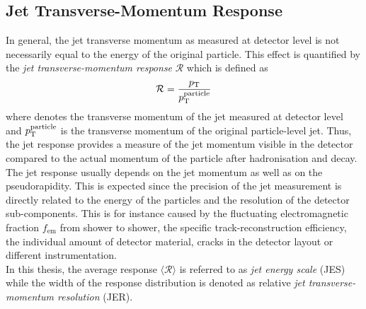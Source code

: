 \subsection{Jet Transverse-Momentum Response}
\label{subsec:jets_response}
In general, the jet transverse momentum as measured at detector level is not necessarily equal to the energy of the original particle. This effect is quantified by the \textit{jet transverse-momentum response} $\mathcal{R}$ which is defined as 
\begin{equation}
  \mathcal{R} = \frac{p_{\text{T}}}{p_{\text{T}}^{\mathrm{particle}}} 
  \label{eq:response}
 \end{equation}
where \pt denotes the transverse momentum of the jet measured at detector level and $p_{\text{T}}^{\rm{particle}}$ is the transverse momentum of the original particle-level jet. Thus, the jet response provides a measure of the jet momentum visible in the detector compared to the actual momentum of the particle after hadronisation and decay. The jet response usually depends on the jet momentum as well as on the pseudorapidity. This is expected since the precision of the jet measurement is directly related to the energy of the particles and the resolution of the detector sub-components. This is for instance caused by the fluctuating electromagnetic fraction $f_\mathrm{em}$ from shower to shower, the specific track-reconstruction efficiency, the individual amount of detector material, cracks in the detector layout or different instrumentation. \\
In this thesis, the average response $\langle \mathcal{R} \rangle$ is referred to as \textit{jet energy scale} (JES) while the width of the response distribution is denoted as relative \textit{jet transverse-momentum resolution} (JER).

